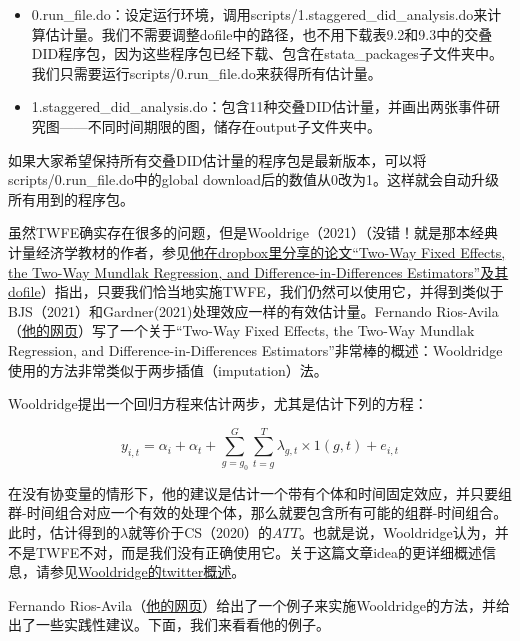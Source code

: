 \documentclass[cn,12pt,math=newtx,citestyle=gb7714-2015,bibstyle=gb7714-2015]{elegantbook}
\begin{document}
	\begin{itemize}
		\item 0.run\_file.do：设定运行环境，调用scripts/1.staggered\_did\_analysis.do来计算估计量。我们不需要调整dofile中的路径，也不用下载表9.2和9.3中的交叠DID程序包，因为这些程序包已经下载、包含在stata\_packages子文件夹中。我们只需要运行scripts/0.run\_file.do来获得所有估计量。
		\item 1.staggered\_did\_analysis.do：包含11种交叠DID估计量，并画出两张事件研究图——不同时间期限的图，储存在output子文件夹中。
	\end{itemize}
	
	如果大家希望保持所有交叠DID估计量的程序包是最新版本，可以将scripts/0.run\_file.do中的global download后的数值从0改为1。这样就会自动升级所有用到的程序包。
	
	虽然TWFE确实存在很多的问题，但是Wooldrige（2021）（没错！就是那本经典计量经济学教材的作者，参见\href{https://www.dropbox.com/sh/zj91darudf2fica/AADj_jaf5ZuS1muobgsnxS6Za?dl=0}{他在dropbox里分享的论文“Two-Way Fixed Effects, the Two-Way Mundlak Regression, and Difference-in-Differences Estimators”及其dofile}）指出，只要我们恰当地实施TWFE，我们仍然可以使用它，并得到类似于BJS（2021）和Gardner(2021)处理效应一样的有效估计量。Fernando Rios-Avila（\href{https://friosavila.github.io/playingwithstata/main_jwdid.html}{他的网页}）写了一个关于“Two-Way Fixed Effects, the Two-Way Mundlak Regression, and Difference-in-Differences Estimators”非常棒的概述：Wooldridge使用的方法非常类似于两步插值（imputation）法。
	
	Wooldridge提出一个回归方程来估计两步，尤其是估计下列的方程：
	
	\begin{equation}
		y_{i,t} = \alpha_i +\alpha_t + \sum_{g=g_0}^{G}\sum_{t=g}^{T} \lambda_{g,t} \times 1(g,t) +e_{i,t}
	\end{equation}
	
	在没有协变量的情形下，他的建议是估计一个带有个体和时间固定效应，并只要组群-时间组合对应一个有效的处理个体，那么就要包含所有可能的组群-时间组合。此时，估计得到的$\lambda$就等价于CS（2020）的$ATT$。也就是说，Wooldridge认为，并不是TWFE不对，而是我们没有正确使用它。关于这篇文章idea的更详细概述信息，请参见\href{https://twitter.com/jmwooldridge/status/1427472491367305219}{Wooldridge的twitter概述}。
	
	Fernando Rios-Avila（\href{https://friosavila.github.io/playingwithstata/main_jwdid.html}{他的网页}）给出了一个例子来实施Wooldridge的方法，并给出了一些实践性建议。下面，我们来看看他的例子。
	
\end{document}
